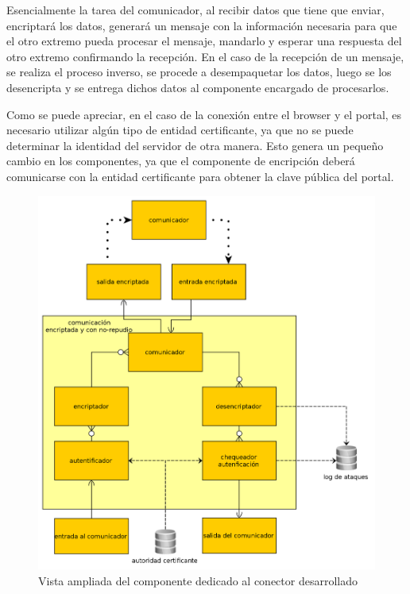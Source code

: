 Esencialmente la tarea del comunicador, al recibir datos que tiene que enviar, encriptará los datos, generará un mensaje con la información necesaria para que el otro extremo pueda procesar el mensaje, mandarlo y esperar una respuesta del otro extremo confirmando la recepción.
En el caso de la recepción de un mensaje, se realiza el proceso inverso, se procede a desempaquetar los datos, luego se los desencripta y se entrega dichos datos al componente encargado de procesarlos.

Como se puede apreciar, en el caso de la conexión entre el browser y el portal, es necesario utilizar algún tipo de entidad certificante, ya que no se puede determinar la identidad del servidor de otra manera. Esto genera un pequeño cambio en los componentes, ya que el componente de encripción deberá comunicarse con la entidad certificante para obtener la clave pública del portal.

\begin{figure}[H]
	\begin{center}
		\includegraphics[scale=0.26]{../diagramas/conector.png}
		\caption{Vista ampliada del componente dedicado al conector desarrollado}
	\end{center} 
\end{figure} 


